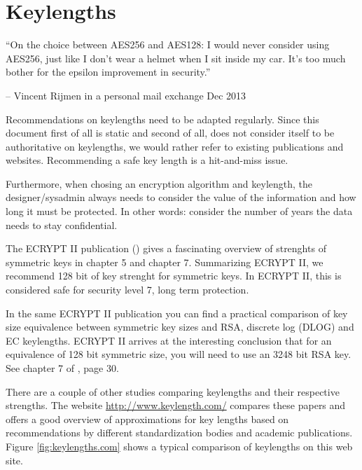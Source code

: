\section{Keylengths}
\label{section:keylengths}


\epigraph{``On the choice between AES256 and AES128: I would never consider
using AES256, just like I don't wear a helmet when I sit inside my car. It's
too much bother for the epsilon improvement in security.''}{-- Vincent Rijmen
in a personal mail exchange Dec 2013}

Recommendations on keylengths need to be adapted regularly. Since this document
first of all is static and second of all, does not consider itself to be
authoritative on keylengths, we would rather refer to existing publications and
websites.  Recommending a safe key length is a hit-and-miss issue.

Furthermore, when chosing an encryption algorithm and keylength, the
designer/sysadmin always needs to consider the value of the information and how
long it must be protected.  In other words: consider the number of years the
data needs to stay confidential.


The ECRYPT II publication (\cite{ii2011ecrypt}) gives a fascinating overview of
strenghts of symmetric keys in chapter 5 and chapter 7. Summarizing ECRYPT II, we
recommend 128 bit of key strenght for symmetric keys. In ECRYPT II, this is
considered safe for security level 7, long term protection.

In the same ECRYPT II publication you can find a practical comparison of key size
equivalence between symmetric key sizes and RSA, discrete log (DLOG) and EC
keylengths. ECRYPT II arrives at the interesting conclusion that for an
equivalence of 128 bit symmetric size, you will need to use an 3248 bit RSA
key. See chapter 7 of \cite{ii2011ecrypt}, page 30.


There are a couple of other studies comparing keylengths and their respective
strengths.  The website \url{http://www.keylength.com/} compares these papers
and offers a good overview of approximations for key lengths based on
recommendations by different standardization bodies and academic publications.
Figure \ref{fig:keylengths.com} shows a typical comparison of keylengths on
this web site.

